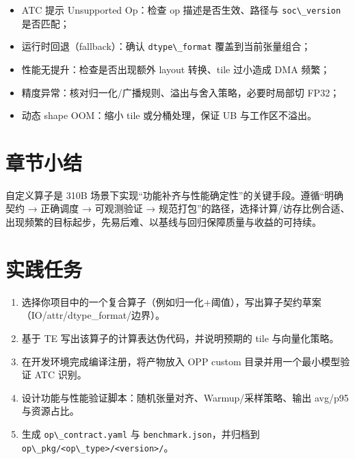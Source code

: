 \begin{itemize}
\tightlist
\item
  ATC 提示 Unsupported Op：检查 op 描述是否生效、路径与
  \passthrough{\lstinline!soc\_version!} 是否匹配；
\item
  运行时回退（fallback）：确认 \passthrough{\lstinline!dtype\_format!}
  覆盖到当前张量组合；
\item
  性能无提升：检查是否出现额外 layout 转换、tile 过小造成 DMA 频繁；
\item
  精度异常：核对归一化/广播规则、溢出与舍入策略，必要时局部切 FP32；
\item
  动态 shape OOM：缩小 tile 或分桶处理，保证 UB 与工作区不溢出。
\end{itemize}

\section{章节小结}\label{ux7ae0ux8282ux5c0fux7ed3}

自定义算子是 310B
场景下实现``功能补齐与性能确定性''的关键手段。遵循``明确契约 → 正确调度
→ 可观测验证 →
规范打包''的路径，选择计算/访存比例合适、出现频繁的目标起步，先易后难、以基线与回归保障质量与收益的可持续。

\section{实践任务}\label{ux5b9eux8df5ux4efbux52a1}

\begin{enumerate}
\def\labelenumi{\arabic{enumi}.}
\tightlist
\item
  选择你项目中的一个复合算子（例如归一化+阈值），写出算子契约草案（IO/attr/dtype\_format/边界）。
\item
  基于 TE 写出该算子的计算表达伪代码，并说明预期的 tile 与向量化策略。
\item
  在开发环境完成编译注册，将产物放入 OPP custom 目录并用一个最小模型验证
  ATC 识别。
\item
  设计功能与性能验证脚本：随机张量对齐、Warmup/采样策略、输出 avg/p95
  与资源占比。
\item
  生成 \passthrough{\lstinline!op\_contract.yaml!} 与
  \passthrough{\lstinline!benchmark.json!}，并归档到
  \passthrough{\lstinline!op\_pkg/<op\_type>/<version>/!}。
\end{enumerate}
